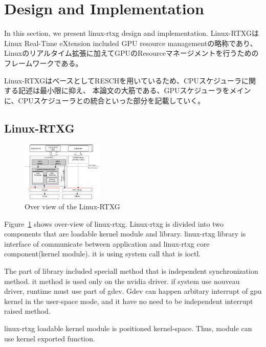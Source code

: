 \section{Design and Implementation}
In this section, we present linux-rtxg design and implementation.
Linux-RTXGはLinux Real-Time eXtension included GPU resource managementの略称であり、Linuxのリアルタイム拡張に加えてGPUのResourceマネージメントを行うためのフレームワークである。

Linux-RTXGはベースとしてRESCHを用いているため、CPUスケジューラに関する記述は最小限に抑え、
本論文の大筋である、GPUスケジューラをメインに、CPUスケジューラとの統合といった部分を記載していく。

\subsection{Linux-RTXG}
\begin{figure}[t]
\begin{center}
\includegraphics[width=0.35\textwidth]{img/overview.pdf}
\caption{Over view of the Linux-RTXG}
\end{center}
\label{fig:overview}
\end{figure}

Figure~\ref{fig:overview} shows over-view of linux-rtxg.
Linux-rtxg is divided into two components that are loadable kernel module and library.
linux-rtxg library is interface of communicate between application and linux-rtxg core component(kernel module).
it is using system call that is ioctl.

The part of library included speciall method that is independent synchronization method.
it method is used only on the nvidia driver.
if system use nouveau driver, runtime must use part of gdev.
Gdev can happen arbitary interrupt of gpu kernel in the user-space mode, and it have no need to be independent interrupt raised method.

linux-rtxg loadable kernel module is positioned kernel-space.
Thus, module can use kernel exported function.

